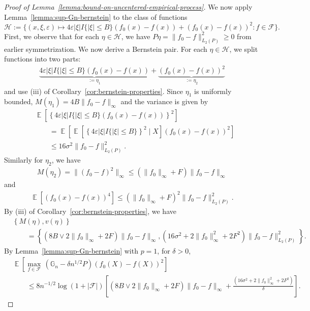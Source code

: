 \documentclass[12pt]{article}
\DeclareMathOperator*{\E}{\mathbb{E}}
\begin{document}
\begin{appendices}
\begin{proof}[Proof of Lemma~\ref{lemma:bound-on-uncentered-empirical-process}]
We now apply Lemma~\ref{lemma:sup-Gn-bernstein} to the class of functions 
\[\mathcal{H} := \{(x, \xi, \varepsilon) \mapsto 4\varepsilon|\xi|I\{|\xi|\le B\}(f_0(x)-f(x))+ (f_0(x)-f(x))^2 : f \in \mathcal{F}\}.\nonumber\]
First, we observe that for each $\eta \in \mathcal{H}$, we have $P \eta = \|f_0-f\|_{L_2(P)}^2 \ge 0$ from earlier symmetrization. We now derive a Bernstein pair. For each $\eta \in \mathcal{H}$, we split functions into two parts:
\begin{align}
	\underbrace{4\varepsilon|\xi|I\{|\xi|\le B\}(f_0(x)-f(x))}_{:=\eta_1}+ \underbrace{(f_0(x)-f(x))^2}_{:=\eta_2}\nonumber
\end{align}
and use (iii) of Corollary~\ref{cor:bernstein-properties}. Since $\eta_1$ is uniformly bounded, $M(\eta_1) = 4B\|f_0-f\|_\infty$ and the variance is given by 
\begin{align}
	&\E\left[\left\{4\varepsilon|\xi|I\{|\xi|\le B\}(f_0(x)-f(x))\right\}^2\right]\nonumber \\
 &\qquad = \E\left[\E\left[\left\{4\varepsilon|\xi|I\{|\xi|\le B\}\right\}^2\mid X\right](f_0(x)-f(x))^2\right]\nonumber\\
	&\qquad \le 16 \sigma^2\|f_0-f\|^2_{L_2(P)}.\nonumber
\end{align}
Similarly for $\eta_2$, we have 
\begin{align}
	M(\eta_2) = \|(f_0-f)^2\|_\infty \le (\|f_0\|_\infty + F)\|f_0 - f\|_\infty\nonumber
\end{align}
and 
\begin{align}
	\E\left[(f_0(x)-f(x))^4\right] \le (\|f_0\|_\infty + F)^2\|f_0-f\|^2_{L_2(P)}.\nonumber
	\end{align}
By (iii) of Corollary~\ref{cor:bernstein-properties}, we have
	\begin{align}
		&\left\{M(\eta), v(\eta)\right\}\nonumber\\
  &\qquad = \left\{(8B \vee 2\|f_0\|_\infty + 2F)\|f_0-f\|_\infty, (16\sigma^2+2\|f_0\|_\infty^2 + 2F^2)\|f_0-f\|^2_{L_2(P)}\right\}.\nonumber
	\end{align} 
By Lemma~\ref{lemma:sup-Gn-bernstein} with $p=1$, for $\delta > 0$, 
\begin{align}
		&\E\left[\max_{f \in \mathcal{F}}\, (\mathbb{G}_n-\delta n^{1/2} P)(f_0(X)-f(X))^2\right] \nonumber\\
		&\qquad \le 8n^{-1/2}\log (1+|\mathcal{F}|)\left[(8B \vee 2\|f_0\|_\infty + 2F)\|f_0-f\|_\infty+\frac{(16\sigma^2+2\|f_0\|_\infty^2 + 2F^2)}{\delta}\right].\nonumber
	\end{align}
	

\end{proof}
\end{appendices}
\end{document}
